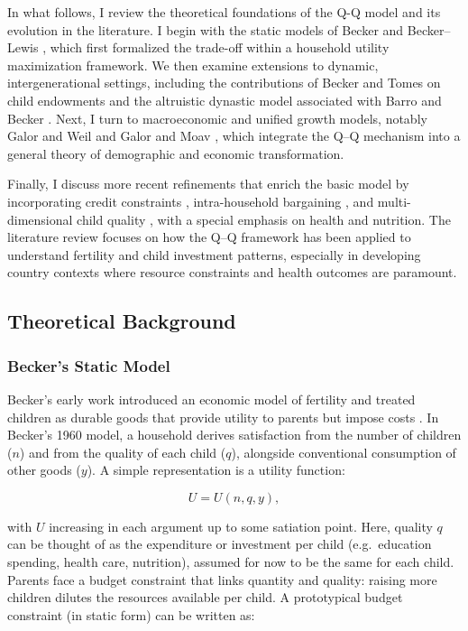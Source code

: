 \documentclass[]{AEA}
\begin{document}
In what follows, I review the theoretical foundations of the Q-Q model
and its evolution in the literature. I begin with the static models of
Becker \citep{becker1960economic} and Becker--Lewis
\citep{becker1973interaction}, which first formalized the trade-off
within a household utility maximization framework. We then examine
extensions to dynamic, intergenerational settings, including the
contributions of Becker and Tomes \citep{becker1976child} on child
endowments and the altruistic dynastic model associated with Barro and
Becker \citep{barro1989fertility}. Next, I turn to macroeconomic and
unified growth models, notably Galor and Weil
\citep{galor2000population} and Galor and Moav \citep{galor2002natural},
which integrate the Q--Q mechanism into a general theory of demographic
and economic transformation.

Finally, I discuss more recent refinements that enrich the basic model
by incorporating credit constraints \citep{doepke2004accounting},
intra-household bargaining \citep{doepke2019bargaining}, and
multi-dimensional child quality
\citep{hoddinott2013economic, kalemli2002does}, with a special emphasis
on health and nutrition. The literature review focuses on how the Q--Q
framework has been applied to understand fertility and child investment
patterns, especially in developing country contexts where resource
constraints and health outcomes are paramount.

\subsection{Theoretical Background}

\subsubsection{Becker’s Static Model}

Becker's early work introduced an economic model of fertility and
treated children as durable goods that provide utility to parents but
impose costs \citep{doepke2015gary}. In Becker's 1960 model, a household
derives satisfaction from the number of children (\(n\)) and from the
quality of each child (\(q\)), alongside conventional consumption of
other goods (\(y\)). A simple representation is a utility function:

\[
U = U(n, q, y),
\]

with \(U\) increasing in each argument up to some satiation point. Here,
quality \(q\) can be thought of as the expenditure or investment per
child (e.g.~education spending, health care, nutrition), assumed for now
to be the same for each child. Parents face a budget constraint that
links quantity and quality: raising more children dilutes the resources
available per child. A prototypical budget constraint (in static form)
can be written as:
\end{document}
